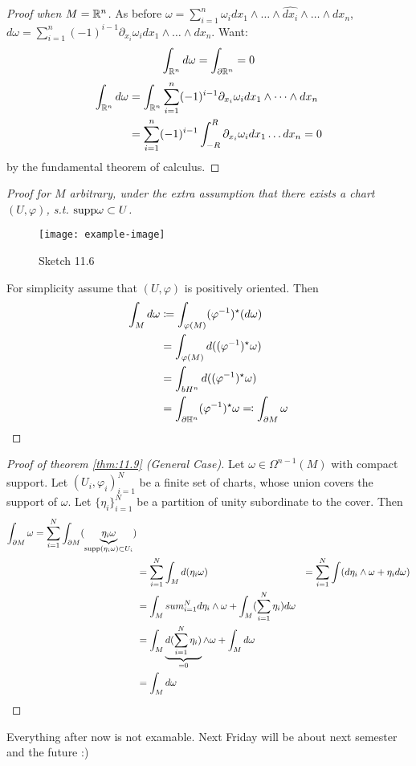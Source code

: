 \begin{proof}[Proof when \(M=\mathbb{R}^n\)]
    As before \(\omega=\sum_{i=1}^n\omega_i dx_1\wedge \dots \wedge \hat{dx_i}\wedge \dots\wedge dx_n\),
    \(d\omega=\sum_{i=1}^n(-1)^{i-1}\partial_{x_i}\omega_i dx_1\wedge \dots \wedge dx_n\). Want:
    \[\int_{\mathbb{R}^n}d\omega=\int_{\partial \mathbb{R}^n}=0\]
    \begin{align*}
        \int_{\mathbb{R}^n} d\omega&=\int_{\mathbb{R}^n} \sum_{i=1}^n(-1)^{i-1}\partial_{x_i}\omega_i dx_1\wedge \dots \wedge dx_n \\
        &=\sum_{i=1}^n(-1)^{i-1}\int_{-R}^R\partial_{x_i}\omega_i dx_1\dots dx_n =0
    \end{align*}
    by the fundamental theorem of calculus.
\end{proof}

\begin{proof}[Proof  for \(M\) arbitrary, under the extra assumption that  there exists a chart \((U,\varphi)\), s.t. 
              \(\text{supp}\omega\subset U\)]
    \begin{figure}[H]\label{fig:11.6}
        \centering
        \texttt{[image: example-image]}
        \caption{Sketch 11.6}
    \end{figure}
    For simplicity assume that \((U,\varphi)\) is positively oriented. Then 
    \begin{align*}
        \int_M d\omega&\coloneqq \int_{\varphi(M)}(\varphi^{-1})^\star(d\omega)\\
        &=\int_{\varphi(M)}d((\varphi^{-1})^\star \omega)\\
        &=\int_{bH^n} d((\varphi^{-1})^\star \omega)\\
        &=\int_{\partial \mathbb{H}^n} (\varphi^{-1})^\star \omega\eqqcolon\int_{\partial M} \omega
    \end{align*}
\end{proof}

\begin{proof}[Proof of theorem \ref{thm:11.9} (General Case)]
    Let \(\omega\in \Omega^{n-1}(M)\) with compact support. Let \((U_i,\varphi_i)_{i=1}^N\)
    be a finite set of charts, whose union covers the support of \(\omega\). Let 
    \(\{\eta_i\}_{i=1}^N\) be a partition of unity subordinate to the cover. Then 
    \begin{align*}
        \int_{\partial M}\omega= \sum_{i=1}^N\int_{\partial M} (\underbrace{\eta_i\omega}_{\text{supp}(\eta_i\omega)\subset U_i})\\
        &=\sum_{i=1}^N\int_M d(\eta_i\omega)
        &=\sum_{i=1}^N \int (d\eta_i\wedge \omega+\eta_id\omega)\\
        &=\int_M sum_{i=1}^N d\eta_i\wedge \omega +\int_M (\sum_{i=1}^N \eta_i) d\omega\\
        &=\int_M \underbrace{d(\sum_{i=1}^N \eta_i)}_{=0}\wedge \omega +\int_M d\omega\\
        &=\int_M d\omega \qedhere
    \end{align*}
\end{proof}
Everything after now is not examable. Next Friday will be about next semester and the future :)
